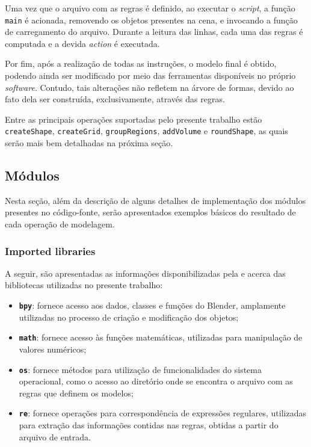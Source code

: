 Uma vez que o arquivo com as regras é definido, ao executar o \textit{script}, a função \texttt{main} é acionada, removendo os objetos presentes na cena, e invocando a função de carregamento do arquivo. Durante a leitura das linhas, cada uma das regras é computada e a devida \textit{action} é executada.

Por fim, após a realização de todas as instruções, o modelo final é obtido, podendo ainda ser modificado por meio das ferramentas disponíveis no próprio \textit{software}. Contudo, tais alterações não refletem na árvore de formas, devido ao fato dela ser construída, exclusivamente, através das regras.

Entre as principais operações suportadas pelo presente trabalho estão \texttt{createShape}, \texttt{createGrid}, \texttt{groupRegions}, \texttt{addVolume} e \texttt{roundShape}, as quais serão mais bem detalhadas na próxima seção.

\subsection{Módulos}
\label{sec:modulos}

Nesta seção, além da descrição de alguns detalhes de implementação dos módulos presentes no código-fonte, serão apresentados exemplos básicos do resultado de cada operação de modelagem.

\subsubsection{Imported libraries}
\label{sec:imports}

A seguir, são apresentadas as informações disponibilizadas pela  e  acerca das bibliotecas utilizadas no presente trabalho:

\begin{itemize}
    \item \textbf{\texttt{bpy}}: fornece acesso aos dados, classes e funções do Blender, amplamente utilizadas no processo de criação e modificação dos objetos;
    
    \item \textbf{\texttt{math}}: fornece acesso às funções matemáticas, utilizadas para manipulação de valores numéricos;
    
    \item \textbf{\texttt{os}}: fornece métodos para utilização de funcionalidades do sistema operacional, como o acesso ao diretório onde se encontra o arquivo com as regras que definem os modelos;
    
    \item \textbf{\texttt{re}}: fornece operações para correspondência de expressões regulares, utilizadas para extração das informações contidas nas regras, obtidas a partir do arquivo de entrada.
\end{itemize}

